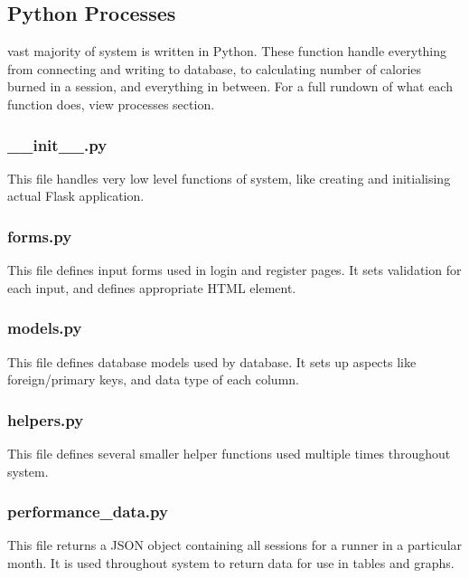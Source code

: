 \documentclass{article}[12pt,a4paper]
\begin{document}
\subsection{Python Processes}
vast majority of system is written in Python. These function handle everything from connecting and writing to database, to calculating number of calories burned in a session, and everything in between. For a full rundown of what each function does, view processes section.

\subsubsection{\_\_init\_\_.py}
This file handles very low level functions of system, like creating and initialising actual Flask application.


\subsubsection{forms.py}
This file defines input forms used in login and register pages. It sets validation for each input, and defines appropriate HTML element.


\subsubsection{models.py}
This file defines database models used by database. It sets up aspects like foreign/primary keys, and data type of each column.


\subsubsection{helpers.py}
This file defines several smaller helper functions used multiple times throughout system.


\subsubsection{performance\_data.py}
This file returns a JSON object containing all sessions for a runner in a particular month. It is used throughout system to return data for use in tables and graphs.

\end{document}
